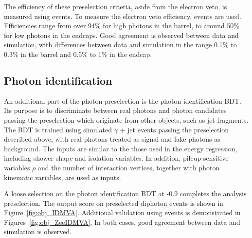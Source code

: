 The efficiency of these preselection criteria, aside from the electron veto, 
is measured using \Zee events.
To measure the electron veto efficiency, \Zmumug events are used.
Efficiencies range from over 94\% for high \RNINE photons in the barrel, 
to around 50\% for low \RNINE photons in the endcaps.
Good agreement is observed between data and simulation, 
with differences between data and simulation in the range 0.1\% to 0.3\% in the barrel 
and 0.5\% to 1\% in the endcap.

\subsection{Photon identification}
\label{sec:objects_PhotonIDBDT}

An additional part of the photon preselection is the photon identification BDT.
Its purpose is to discriminate between real photons and photon candidates passing the preselection which originate from other objects, 
such as jet fragments.
The BDT is trained using simulated $\gamma$ + jet events passing the preselection described above, with real photons treated as signal and fake photons as background.
The inputs are similar to the those used in the energy regression, 
including shower shape and isolation variables.
In addition, pileup-sensitive variables $\rho$ and the number of interaction vertices, 
together with photon kinematic variables, are used as inputs.

A loose selection on the photon identification BDT at -0.9 completes the analysis preselection.
The output score on preselected diphoton events is shown in Figure~\ref{fig:obj_IDMVA}.
Additional validation using \Zee events is demonstrated in Figures~\ref{fig:obj_ZeeIDMVA}.
In both cases, good agreement between data and simulation is observed.

